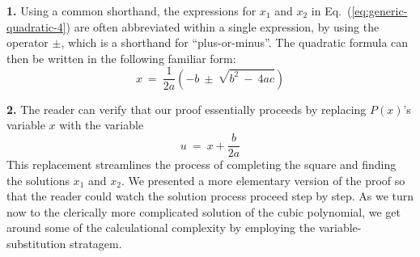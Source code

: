 
\medskip

{\bf 1.}
Using a common shorthand, the expressions for $x_1$ and $x_2$ in Eq.~(\ref{eq:generic-quadratic-4}) are often abbreviated within a single expression, by using the operator $\pm$, which is a shorthand for ``plus-or-minus''.  The quadratic formula can then be written in the following familiar form:
\[
x \ = \  \frac{1}{2a} \left( -b \ \pm \ \sqrt{b^2 \ - \ 4ac} \right)
\]

\smallskip

{\bf 2.}
The reader can verify that our proof essentially proceeds by replacing $P(x)$'s variable $x$ with the variable
\[ u \ = \ x + \frac{b}{2a} \]
This replacement streamlines the process of completing the square and finding the solutions $x_1$ and $x_2$.  We presented a more elementary version of the proof so that the reader could watch the solution process proceed step by step.  As we turn now to the clerically more complicated solution of the cubic polynomial, we get around some of the calculational complexity by employing the variable-substitution stratagem.

\smallskip

